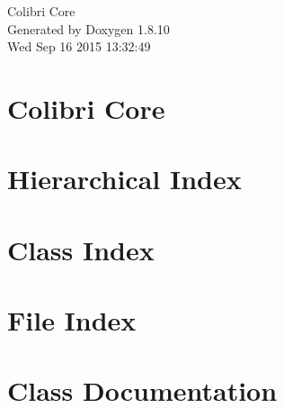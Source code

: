 \documentclass[twoside]{book}
\newcommand{\+}{\discretionary{\mbox{\scriptsize$\hookleftarrow$}}{}{}}
\newcommand{\clearemptydoublepage}{%
  \newpage{\pagestyle{empty}\cleardoublepage}%
}
\begin{document}
\hypersetup{pageanchor=false,
             bookmarks=true,
             bookmarksnumbered=true,
             pdfencoding=unicode
            }
\begin{titlepage}
\vspace*{7cm}
\begin{center}%
{\Large Colibri Core }\\
\vspace*{1cm}
{\large Generated by Doxygen 1.8.10}\\
\vspace*{0.5cm}
{\small Wed Sep 16 2015 13:32:49}\\
\end{center}
\end{titlepage}
\clearemptydoublepage
\tableofcontents
\clearemptydoublepage
{}
\hypersetup{pageanchor=true}

\chapter{Colibri Core}
\label{index}\hypertarget{index}{}
\chapter{Hierarchical Index}

\chapter{Class Index}

\chapter{File Index}

\chapter{Class Documentation}





































\end{document}
